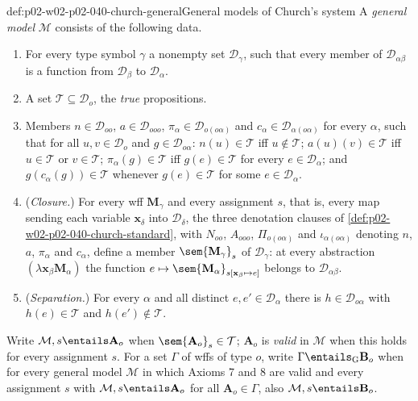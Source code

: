 \begin{hbdefinition}{def:p02-w02-p02-040-church-general}{General models of Church's system}
A \emph{general model} \(\mathcal M\) consists of the following data.
\begin{enumerate}
 \item[(G1)] For every type symbol \(\gamma\) a nonempty set
   \(\mathcal D_\gamma\), such that every member of \(\mathcal D_{\alpha\beta}\)
   is a function from \(\mathcal D_\beta\) to \(\mathcal D_\alpha\).
 \item[(G2)] A set \(\mathcal T\subseteq\mathcal D_o\), the \emph{true}
   propositions.
 \item[(G3)] Members \(n\in\mathcal D_{oo}\), \(a\in\mathcal D_{ooo}\),
   \(\pi_\alpha\in\mathcal D_{o(o\alpha)}\) and
   \(c_\alpha\in\mathcal D_{\alpha(o\alpha)}\) for every \(\alpha\), such that
   for all \(u,v\in\mathcal D_o\) and \(g\in\mathcal D_{o\alpha}\):
   \(n(u)\in\mathcal T\) iff \(u\notin\mathcal T\);
   \(a(u)(v)\in\mathcal T\) iff \(u\in\mathcal T\) or \(v\in\mathcal T\);
   \(\pi_\alpha(g)\in\mathcal T\) iff \(g(e)\in\mathcal T\) for every
   \(e\in\mathcal D_\alpha\); and \(g(c_\alpha(g))\in\mathcal T\) whenever
   \(g(e)\in\mathcal T\) for some \(e\in\mathcal D_\alpha\).
 \item[(G4)] (\emph{Closure.})  For every wff \(\mathbf M_\gamma\) and every
   assignment \(s\), that is, every map sending each variable
   \(\mathbf x_\delta\) into \(\mathcal D_\delta\), the three denotation
   clauses of \cref{def:p02-w02-p02-040-church-standard}, with
   \(N_{oo}\), \(A_{ooo}\), \(\Pi_{o(o\alpha)}\) and \(\iota_{\alpha(o\alpha)}\)
   denoting \(n\), \(a\), \(\pi_\alpha\) and \(c_\alpha\), define a member
   \(\sem{\mathbf M_\gamma}_s\) of \(\mathcal D_\gamma\): at every abstraction
   \((\lambda\mathbf x_\beta\mathbf M_\alpha)\) the function
   \(e\mapsto\sem{\mathbf M_\alpha}_{s[\mathbf x_\beta\mapsto e]}\) belongs to
   \(\mathcal D_{\alpha\beta}\).
 \item[(G5)] (\emph{Separation.})  For every \(\alpha\) and all distinct
   \(e,e'\in\mathcal D_\alpha\) there is \(h\in\mathcal D_{o\alpha}\) with
   \(h(e)\in\mathcal T\) and \(h(e')\notin\mathcal T\).
\end{enumerate}
Write \(\mathcal M,s\entails\mathbf A_o\) when
\(\sem{\mathbf A_o}_s\in\mathcal T\); \(\mathbf A_o\) is \emph{valid} in
\(\mathcal M\) when this holds for every assignment \(s\).  For a set
\(\Gamma\) of wffs of type \(o\), write \(\Gamma\entails_{\mathrm G}\mathbf B_o\)
when for every general model \(\mathcal M\) in which Axioms 7 and 8 are valid
and every assignment \(s\) with \(\mathcal M,s\entails\mathbf A_o\) for all
\(\mathbf A_o\in\Gamma\), also \(\mathcal M,s\entails\mathbf B_o\).
\end{hbdefinition}

